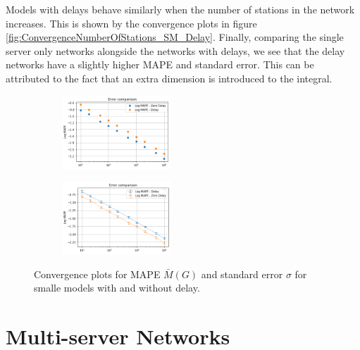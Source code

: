 Models with delays behave similarly when the number of stations in the network increases. This is shown by the convergence plots in figure \ref{fig:ConvergenceNumberOfStations_SM_Delay}. Finally, comparing the single server only networks alongside the networks with delays, we see that the delay networks have a slightly higher MAPE and standard error. This can be attributed to the fact that an extra dimension is introduced to the integral.

\begin{figure}[!htb]
\begin{center}
\begin{subfigure}
    \centering
    \includegraphics[width=0.45\textwidth]{Chap6_EvaluationAndAnalysis/images/ConvergenceComparison_DelayNoDelay_meanerr.png}
\end{subfigure}
\begin{subfigure}
    \centering
    \includegraphics[width=0.45\textwidth]{Chap6_EvaluationAndAnalysis/images/ConvergenceComparison_DelayNoDelay.png}
\end{subfigure}
\caption{ Convergence plots for MAPE \(\bar{M}(G)\) and standard error \(\sigma\) for smalle models with and without delay.}
\label{fig:ConvergenceComparison_DelayNoDelay}
\end{center}
\end{figure}


\section{Multi-server Networks}\label{sec:Multiserver}

